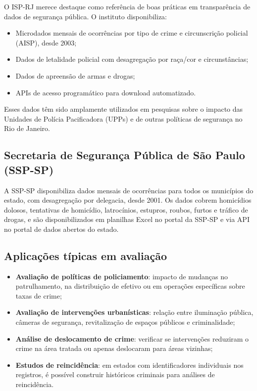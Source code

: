 O ISP-RJ merece destaque como referência de boas práticas em transparência de dados de segurança pública. O instituto disponibiliza:

\begin{itemize}
  \item Microdados mensais de ocorrências por tipo de crime e circunscrição policial (AISP), desde 2003;
  \item Dados de letalidade policial com desagregação por raça/cor e circunstâncias;
  \item Dados de apreensão de armas e drogas;
  \item APIs de acesso programático para download automatizado.
\end{itemize}

Esses dados têm sido amplamente utilizados em pesquisas sobre o impacto das Unidades de Polícia Pacificadora (UPPs) e de outras políticas de segurança no Rio de Janeiro.

\subsection{Secretaria de Segurança Pública de São Paulo (SSP-SP)}

A SSP-SP disponibiliza dados mensais de ocorrências para todos os municípios do estado, com desagregação por delegacia, desde 2001. Os dados cobrem homicídios dolosos, tentativas de homicídio, latrocínios, estupros, roubos, furtos e tráfico de drogas, e são disponibilizados em planilhas Excel no portal da SSP-SP e via API no portal de dados abertos do estado.

\subsection{Aplicações típicas em avaliação}

\begin{itemize}
  \item \textbf{Avaliação de políticas de policiamento}: impacto de mudanças no patrulhamento, na distribuição de efetivo ou em operações específicas sobre taxas de crime;
  \item \textbf{Avaliação de intervenções urbanísticas}: relação entre iluminação pública, câmeras de segurança, revitalização de espaços públicos e criminalidade;
  \item \textbf{Análise de deslocamento de crime}: verificar se intervenções reduziram o crime na área tratada ou apenas deslocaram para áreas vizinhas;
  \item \textbf{Estudos de reincidência}: em estados com identificadores individuais nos registros, é possível construir históricos criminais para análises de reincidência.
\end{itemize}

